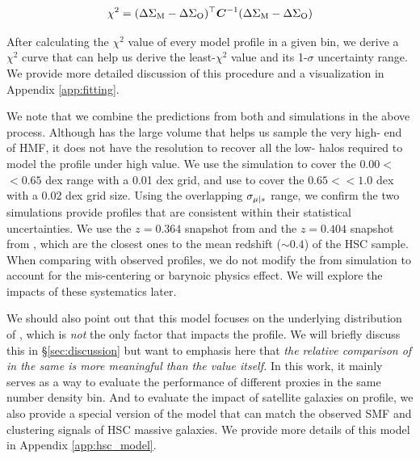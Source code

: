\documentclass[fleqn,usenatbib,useAMS,english]{mnras}
\begin{document}
    \begin{equation}
        \chi^{2}=(\Delta\Sigma_{\rm M}-\Delta\Sigma_{\rm O})^{\top} \boldsymbol{C}^{-1}(\Delta\Sigma_{\rm M}-\Delta\Sigma_{\rm O})
        \label{eq:chi2}
    \end{equation}

    \noindent After calculating the $\chi^2$ value of every model \dsigma{} profile in a given
    \topn{} bin, we derive a $\chi^2$ curve that can help us derive the least-$\chi^2$
    \scatterMhaloObsSym{} value and its 1-$\sigma$ uncertainty range.
    We provide more detailed discussion of this procedure and a visualization in Appendix
    \ref{app:fitting}.

    We note that we combine the predictions from both  and \smdpl{} simulations in the
    above process.
    Although  has the large volume that helps us sample the very high-\mhalo{} end of
    HMF, it does not have the resolution to recover all the low-\mhalo{} halos required to model
    the \dsigma{} profile under high \scatterMhaloObsSym{} value.
    We use the  simulation to cover the $0.00 <$\scatterMhaloObsSym{}$<0.65$ dex range
    with a 0.01 dex grid, and use \smdpl{} to cover the $0.65 <$\scatterMhaloObsSym{}$<1.0$ dex
    with a 0.02 dex grid size.
    Using the overlapping $\sigma_{\mu{} | s{}}{}$ range, we confirm the two simulations
    provide \dsigma{} profiles that are consistent within their statistical uncertainties.
    We use the $z=0.364$ snapshot from  and the $z=0.404$ snapshot from \smdpl{}, which
    are the closest ones to the mean redshift ($\sim 0.4$) of the HSC sample.
    When comparing with observed \dsigma{} profiles, we do not modify the \dsigma{} from simulation 
    to account for the mis-centering or barynoic physics effect.
    We will explore the impacts of these systematics later.

    We should also point out that this model focuses on the underlying distribution of \mvir{},
    which is \emph{not} the only factor that impacts the \dsigma{} profile.
    We will briefly discuss this in \S \ref{sec:discussion} but want to emphasis here that
    \emph{the relative comparison of \scatterMhaloObsSym{} in the same \topn{} is more
    meaningful than the value itself.}
    In this work, it mainly serves as a way to evaluate the performance of different \mhalo{}
    proxies in the same number density bin.
    And to evaluate the impact of satellite galaxies on \dsigma{} profile, we also provide a
    special version of the model that can match the observed SMF and clustering signals of HSC
    massive galaxies.
    We provide more details of this model in Appendix \ref{app:hsc_model}.
\end{document}

